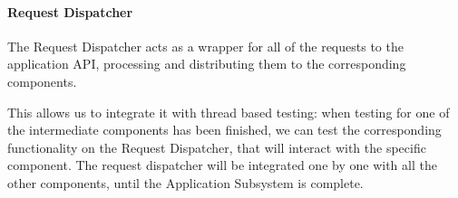 \documentclass[english]{article}
\begin{document}
\begin{figure}[H]
	\centering
\end{figure}
\begin{figure}[H]
	\centering
\end{figure}


\paragraph{Request Dispatcher}
The Request Dispatcher acts as a wrapper for all of the requests to the application API, processing and distributing them to the corresponding components.

This allows us to integrate it with thread based testing: when testing for one of the intermediate components has been finished, we can test the corresponding functionality on the Request Dispatcher, that will interact with the specific component.
The request dispatcher will be integrated one by one with all the other components, until the Application Subsystem is complete.
\end{document}
